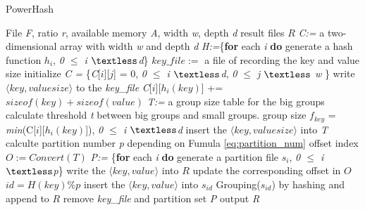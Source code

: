 \begin{algorithm}[ht]
    \caption{PowerHash}
  \label{alg:group}
    \begin{algorithmic}[1]
    \Require  File \emph{F}, ratio \emph{r}, available memory \emph{A}, width \emph{w}, depth \emph{d}
    \Ensure result files $R$
    \State \emph{C:=} a two-dimensional array with width \emph{w} and depth \emph{d}
    \State \emph{H:=}\{\textbf{for} each \emph{i} \textbf{do} generate a hash function $h_i$, \emph{0 $\le$ i $\textless$d}\}    
    \State $key\_file :=$ a file of recording the key and value size
    \State initialize \emph{C = } \{\emph{C}[$i$][$j$] = 0, \emph{0 $\le$ i $\textless$d}, \emph{0 $\le$ j $\textless$ w} \}
    	\State write $\langle key,valuesize\rangle$ to the \emph{key\_file}
          \State \emph{C}[$i$][$h_{i}(key)$] += $sizeof(key) + sizeof(value)$
        \EndFor  
    \EndFor
    \State \emph{T:=} a group size table for the big groups
    \State calculate threshold \emph{t} between big groups and small groups.
    	\State group size $f_{key}$ = \emph{min}(C[$i$][$h_{i}(key)$]), \emph{0 $\le$ i $\textless$d}
    		\State insert the $\langle key,valuesize\rangle$ into \emph{T}    
    	\EndIf    	
    \EndFor
    \State calculte partition number \emph{p} depending on Fumula \ref{eq:partition_num}
    \State offset index $O:=Convert(T)$
    \State \emph{P:=} \{\textbf{for} each \emph{i} \textbf{do} generate a partition file $s_i$, \emph{0 $\le$ i $\textless$p}\}
    		\State write the $\langle key,value\rangle$ into $R$
    		\State update the corresponding offset in $O$
    	\Else 
    		\State $id = H(key) \% p$
    		\State insert the $\langle key,value\rangle$ into $s_{id}$ 
    	\EndIf
    \EndFor
		\State Grouping($s_{id}$) by hashing and append to $R$
    \EndFor
    \State remove \emph{key\_file} and partition set \emph{P}
    \State output \emph{R}
    \end{algorithmic}
\end{algorithm}

